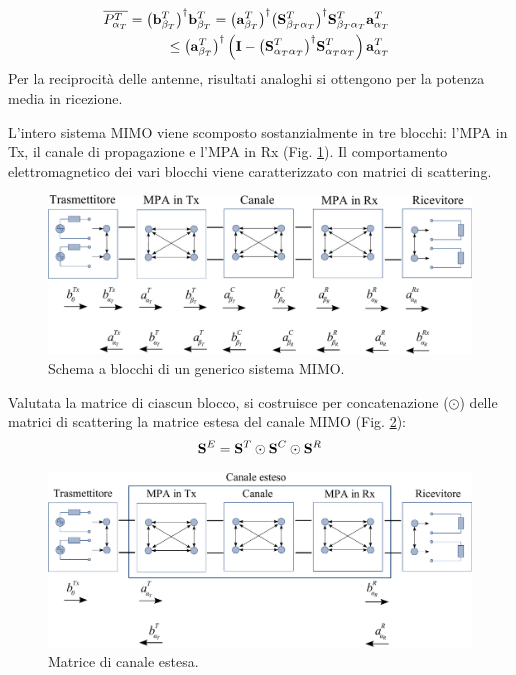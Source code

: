 \documentclass[technote]{IEEEtran}
\begin{document}
\begin{eqnarray}
& & \hspace{-1cm} \overline{P_{{\alpha _T}}^{T}} = {\left( {{\bf{b}}_{{\beta _T}}^T} \right)^\dagger}{\bf{b}}_{{\beta _T}}^T = {\left( {{\bf{a}}_{{\beta _T}}^T} \right)^\dagger}{\left( {{\bf{S}}_{{\beta _T}{\alpha _T}}^T} \right)^\dagger}{\bf{S}}_{{\beta _T}{\alpha _T}}^T{\bf{a}}_{{\alpha _T}}^T \nonumber \\
& & \le {\left( {{\bf{a}}_{{\beta _T}}^T} \right)^\dagger}\left( {{\bf{I}} - {{\left( {{\bf{S}}_{{\alpha _T}{\alpha _T}}^T} \right)}^\dagger}{\bf{S}}_{{\alpha _T}{\alpha _T}}^T} \right){\bf{a}}_{{\alpha _T}}^T \nonumber
\end{eqnarray} Per la reciprocità delle antenne, risultati analoghi si ottengono per la potenza media in ricezione.

\par L'intero sistema MIMO viene scomposto sostanzialmente in tre blocchi: l'MPA in Tx, il canale di propagazione e l'MPA in Rx (Fig. \ref{fig:13}). Il comportamento elettromagnetico dei vari blocchi viene caratterizzato con matrici di scattering.
\begin{figure}[!ht]
\centering
\includegraphics[width=\columnwidth]{figure13}
\caption{Schema a blocchi di un generico sistema MIMO.}
\label{fig:13}
\end{figure}
Valutata la matrice di ciascun blocco, si costruisce per concatenazione ($\odot$) delle matrici di scattering la matrice estesa del canale MIMO (Fig. \ref{fig:14}):
\[{{\bf{S}}^E} = {{\bf{S}}^T} \odot {{\bf{S}}^C} \odot {{\bf{S}}^R}\]
\begin{figure}[!ht]
\centering
\includegraphics[width=\columnwidth]{figure14}
\caption{Matrice di canale estesa.}
\label{fig:14}
\end{figure}
\end{document}
